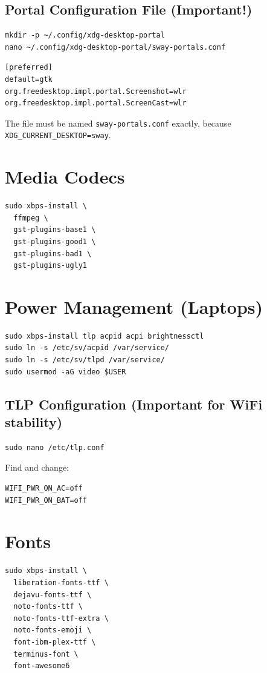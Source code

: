 \documentclass[12pt, a4paper]{book}
\begin{document}
\subsection{Portal Configuration File (Important!)}
\begin{lstlisting}
mkdir -p ~/.config/xdg-desktop-portal
nano ~/.config/xdg-desktop-portal/sway-portals.conf
\end{lstlisting}

\begin{lstlisting}
[preferred]
default=gtk
org.freedesktop.impl.portal.Screenshot=wlr
org.freedesktop.impl.portal.ScreenCast=wlr
\end{lstlisting}

\begin{notebox}
The file must be named \texttt{sway-portals.conf} exactly, because \texttt{XDG\_CURRENT\_DESKTOP=sway}.
\end{notebox}

\section{Media Codecs}
\begin{lstlisting}
sudo xbps-install \
  ffmpeg \
  gst-plugins-base1 \
  gst-plugins-good1 \
  gst-plugins-bad1 \
  gst-plugins-ugly1
\end{lstlisting}

\section{Power Management (Laptops)}
\begin{lstlisting}
sudo xbps-install tlp acpid acpi brightnessctl
sudo ln -s /etc/sv/acpid /var/service/
sudo ln -s /etc/sv/tlpd /var/service/
sudo usermod -aG video $USER
\end{lstlisting}

\subsection{TLP Configuration (Important for WiFi stability)}
\begin{lstlisting}
sudo nano /etc/tlp.conf
\end{lstlisting}
Find and change:
\begin{lstlisting}
WIFI_PWR_ON_AC=off
WIFI_PWR_ON_BAT=off
\end{lstlisting}

\section{Fonts}
\begin{lstlisting}
sudo xbps-install \
  liberation-fonts-ttf \
  dejavu-fonts-ttf \
  noto-fonts-ttf \
  noto-fonts-ttf-extra \
  noto-fonts-emoji \
  font-ibm-plex-ttf \
  terminus-font \
  font-awesome6
\end{lstlisting}
\end{document}
